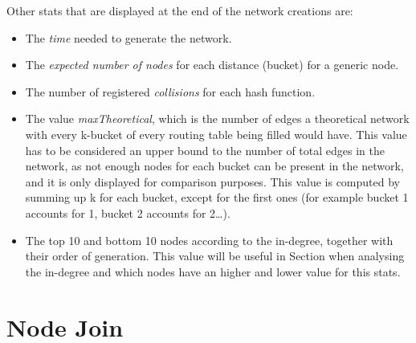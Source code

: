 \documentclass[11pt, a4paper]{report}
\begin{document}
		Other stats that are displayed at the end of the network creations are:
		\begin{itemize}
			\item The \emph{time} needed to generate the network.
			\item The \emph{expected number of nodes} for each distance (bucket) for a generic node.
			\item The number of registered \emph{collisions} for each hash function.
			\item The value \emph{maxTheoretical}, which is the number of edges a theoretical network with every k-bucket of every routing table being filled would have. This value has to be considered an upper bound to the number of total edges in the network, as not enough nodes for each bucket can be present in the network, and it is only displayed for comparison purposes. This value is computed by summing up k for each bucket, except for the first ones (for example bucket 1 accounts for 1, bucket 2 accounts for 2\dots).
			\item The top 10 and bottom 10 nodes according to the in-degree, together with their order of generation. 
			This value will be useful in Section \emph{} when analysing the in-degree and which nodes have an higher and lower value for this stats.
		\end{itemize}
			
\section*{Node Join}
		
\end{document}
